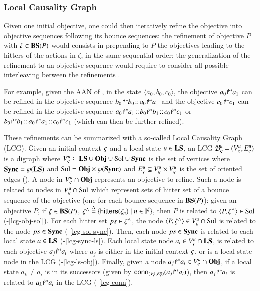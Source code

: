 \subsubsection{Local Causality Graph}

Given one initial objective, one could then iteratively refine the objective into objective
sequences following its bounce sequences:
the refinement of objective $P$ with $\zeta\in\mathbf{BS}(P)$ would consists in prepending to $P$ the
objectives leading to the hitters of the actions in $\zeta$, in the same sequential order;
the generalization of the refinement to an objective sequence would require to consider all possible
interleaving between the refinements \cite{PMR12-MSCS}.

For example, given the AAN of ,
in the state $\langle a_0,b_0,c_0\rangle$,
the objective ${a_0\!\Rsh^*\!\!a_1}$ can be refined in the objective sequence
$\obj{b_0}{b_0}\concat\obj{a_0}{a_1}$
and
the objective ${c_0\!\Rsh^*\!\!c_1}$ can be refined in the objective sequence
$\obj{a_0}{a_1}\concat\obj{b_0}{b_1}\concat\obj{c_0}{c_1}$
or
$\obj{b_0}{b_1}\concat\obj{a_0}{a_1}\concat\obj{c_0}{c_1}$
(which can then be further refined).

These refinements can be summarized with a so-called Local Causality Graph (LCG).
Given an initial context $\varsigma$ and a local state $u\in\mathbf{LS}$,
an LCG ${\mathcal{B}_{\varsigma}^{u}} = (V_\varsigma^u, E_\varsigma^u)$
is a digraph where $V_\varsigma^u \subseteq \mathbf{LS}\cup \mathbf{Obj} \cup \mathrm{Sol} \cup \mathbf{Sync}$ is the set of vertices
where $\mathbf{Sync}=\wp(\mathbf{LS})$ and $\mathrm{Sol}=\mathbf{Obj}\times\wp(\mathbf{Sync})$
and $E_\varsigma^u \subseteq V_\varsigma^u \times V_\varsigma^u$ is the set of oriented edges
().
A node in $V_\varsigma^u\cap\mathbf{Obj}$ represents an objective to refine.
Such a node is related to nodes in $V_\varsigma^u\cap\mathrm{Sol}$ which represent sets of hitter set of a
bounce sequence of the objective (one for each bounce sequence in $\mathbf{BS}(P)$):
given an objective $P$, if $\zeta\in\mathbf{BS}(P)$, $\zeta^\wedge \stackrel{\Delta}= \{\mathsf{hitters}(\zeta_n) \mid
n\in\mathbb{I}^{\zeta} \}$, then $P$ is related to $\langle P, \zeta^\wedge\rangle\in\mathrm{Sol}$
(-\ref{lcg-obj-sol}).
For each hitter set $ps\in\zeta^\wedge$,
the node $\langle P,\zeta^\wedge\rangle\in V_\varsigma^u\cap\mathrm{Sol}$ is
related to the node $ps\in\mathbf{Sync}$
(-\ref{lcg-sol-sync}).
Then, each node $ps\in\mathbf{Sync}$ is related to each local state $a\in\mathbf{LS}$
(-\ref{lcg-sync-ls}).
Each local state node $a_i\in V_\varsigma^u\cap\mathbf{LS}$,
is related to each objective ${a_j\!\Rsh^*\!\!a_i}$ where
$a_j$ is either in the initial context $\varsigma$, or
is a local state node in the LCG
(-\ref{lcg-ls-obj}).
Finally, given a node ${a_j\!\Rsh^*\!\!a_i}\in V_\varsigma^u\cap\mathbf{Obj}$,
if a local state $a_k\neq a_i$ is in its successors (given by
$\mathsf{conn}_{({V_\varsigma^u},{E_\varsigma^u})}({a_j\!\Rsh^*\!\!a_i})$), then
${a_j\!\Rsh^*\!\!a_i}$ is related to ${a_k\!\Rsh^*\!\!a_i}$ in the LCG
(-\ref{lcg-conn}).


